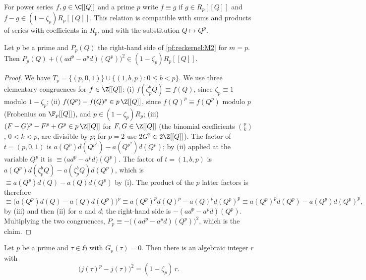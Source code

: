 For power series $f,g\in\C[[Q]]$ and a prime $p$ write $f\equiv g$ if $g\in R_p[[Q]]$ and
$f-g\in(1-\zeta_p)R_p[[Q]]$. This relation is compatible with sums and products of series with coefficients in
$R_p$, and with the substitution $Q\mapsto Q^p$.

\begin{lemma}\label{pf:reckernel:kronSer}
Let $p$ be a prime and $P_p(Q)$ the right-hand side of \ref{pf:reckernel:M2} for $m=p$. Then
$P_p(Q)+\bigl((ad^p-a^pd)(Q^p)\bigr)^2\in(1-\zeta_p)R_p[[Q]]$.
\end{lemma}

\begin{proof}
We have $T_p=\{(p,0,1)\}\cup\{(1,b,p):0\le b<p\}$. We use three elementary congruences for $f\in\Z[[Q]]$:
(i) $f(\zeta_p^bQ)\equiv f(Q)$, since $\zeta_p\equiv1$ modulo $1-\zeta_p$;
(ii) $f(Q^p)-f(Q)^p\in p\,\Z[[Q]]$, since $f(Q)^p\equiv f(Q^p)$ modulo $p$ (Frobenius on $\F_p[[Q]]$), and
$p\in(1-\zeta_p)R_p$; (iii) $(F-G)^p-F^p+G^p\in p\,\Z[[Q]]$ for $F,G\in\Z[[Q]]$ (the binomial coefficients
$\binom pk$, $0<k<p$, are divisible by $p$; for $p=2$ use $2G^2\in2\Z[[Q]]$).
The factor of $t=(p,0,1)$ is $a(Q^p)d(Q^{p^2})-a(Q^{p^2})d(Q^p)$; by (ii) applied at the variable $Q^p$ it is
$\equiv\bigl(ad^p-a^pd\bigr)(Q^p)$. The factor of $t=(1,b,p)$ is $a(Q^p)d(\zeta_p^bQ)-a(\zeta_p^bQ)d(Q^p)$, which is
$\equiv a(Q^p)d(Q)-a(Q)d(Q^p)$ by (i). The product of the $p$ latter factors is therefore
\[
\equiv\bigl(a(Q^p)d(Q)-a(Q)d(Q^p)\bigr)^p\equiv a(Q^p)^pd(Q)^p-a(Q)^pd(Q^p)^p
\equiv a(Q^p)^pd(Q^p)-a(Q^p)d(Q^p)^p,
\]
by (iii) and then (ii) for $a$ and $d$; the right-hand side is $-(ad^p-a^pd)(Q^p)$. Multiplying the two
congruences, $P_p\equiv-\bigl((ad^p-a^pd)(Q^p)\bigr)^2$, which is the claim.
\end{proof}

\begin{lemma}\label{pf:reckernel:kronPt}
Let $p$ be a prime and $\tau\in\mathfrak H$ with $G_p(\tau)=0$. Then there is an algebraic integer $r$ with
\[
\bigl(j(\tau)^p-j(\tau)\bigr)^2=(1-\zeta_p)\,r .
\]
\end{lemma}

